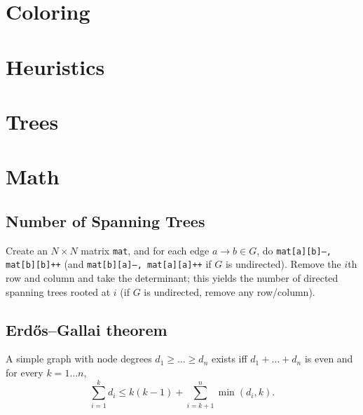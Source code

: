 \section{Coloring}

\section{Heuristics}

\section{Trees}

\section{Math}
	\subsection{Number of Spanning Trees}
		Create an $N\times N$ matrix \texttt{mat}, and for each edge $a \rightarrow b \in G$, do
		\texttt{mat[a][b]--, mat[b][b]++} (and \texttt{mat[b][a]--, mat[a][a]++} if $G$ is undirected).
		Remove the $i$th row and column and take the determinant; this yields the number of directed spanning trees rooted at $i$
		(if $G$ is undirected, remove any row/column).

	\subsection{Erdős–Gallai theorem}
		A simple graph with node degrees $d_1 \ge \dots \ge d_n$ exists iff $d_1 + \dots + d_n$ is even and for every $k = 1\dots n$,
		\[ \sum _{i=1}^{k}d_{i}\leq k(k-1)+\sum _{i=k+1}^{n}\min(d_{i},k). \]
